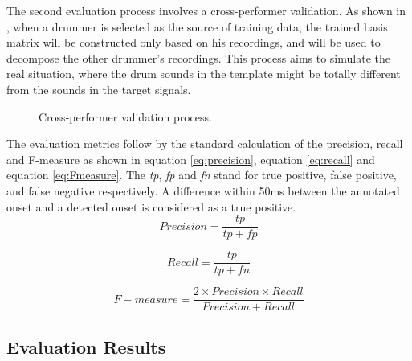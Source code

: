 \documentclass{article}
\begin{document}
The second evaluation process involves a cross-performer validation. As shown in , when a drummer is selected as the source of training data, the trained basis matrix will be constructed only based on his recordings, and will be used to decompose the other drummer’s recordings. This process aims to simulate the real situation, where the drum sounds in the template might be totally different from the sounds in the target signals.
\begin{figure}
 \centerline{}
 \caption{Cross-performer validation process.}
 \label{fig:cross}
\end{figure}

The evaluation metrics follow by the standard calculation of the precision, recall and F-measure as shown in equation \eqref{eq:precision}, equation \eqref{eq:recall} and equation \eqref{eq:Fmeasure}. The {\itshape tp}, {\itshape fp} and {\itshape fn} stand for true positive, false positive, and false negative respectively. A difference within 50ms between the annotated onset and a detected onset is considered as a true positive.  
\begin{equation}
Precision = \frac{tp}{tp + fp}
\label{eq:precision}
\end{equation}

\begin{equation}
Recall = \frac{tp}{tp + fn}
\label{eq:recall}
\end{equation}

\begin{equation}
F-measure = \frac{2 \times Precision \times Recall}{Precision + Recall}
\label{eq:Fmeasure}
\end{equation}
  



\subsection{Evaluation Results}\label{subsec:evaluation results}
\end{document}
